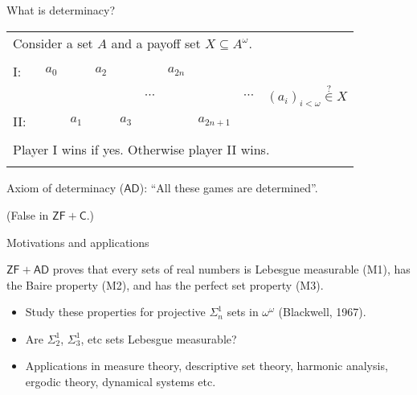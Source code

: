 \documentclass{beamer} %
\begin{document}
\begin{frame}{What is determinacy?}
    
    \begin{tabular}{llllllllll}
        \multicolumn{10}{l}{Consider a set $A$ and a payoff set $X \subseteq A^{\omega}$.}\\
        &&&&&&&&&\\
        I:\ & $a_0$ &       & $a_2$ &       &          &$a_{2n}$   &           & & \\
            &       &       &       &       & $\cdots$ &           &           & $\cdots$ & \qquad ${(a_i)}_{i < \omega} \overset{?}{\in} X$\\
        II:\ &       & $a_1$ &       & $a_3$ &          &           &$a_{2n+1}$ & & \\
        &&&&&&&&&\\
        \multicolumn{10}{l}{Player I wins if yes. Otherwise player II wins.} \\ 
        &&&&&&&&&\\
    \end{tabular}

    Axiom of determinacy ($\mathsf{AD}$): ``All these games are determined''.
    
    (False in $\mathsf{ZF + C}$.)
\end{frame}


\begin{frame}{Motivations and applications}

    \begin{theorem}
        $\mathsf{ZF + AD}$ proves  that every sets of real numbers is Lebesgue measurable (M1), has 
        the Baire property (M2), and has the perfect set property (M3).
    \end{theorem}

    \begin{itemize}
        \item<2-> Study these properties for projective $\Sigma^1_n$ sets in $\omega^{\omega}$
        (Blackwell, 1967).
        \item<3-> Are $\Sigma^1_2$, $\Sigma^1_3$, etc sets Lebesgue measurable?
        \item<4> Applications in measure theory, descriptive set theory, harmonic analysis, ergodic theory, 
        dynamical systems etc.
    \end{itemize}

\end{frame}
\end{document}
